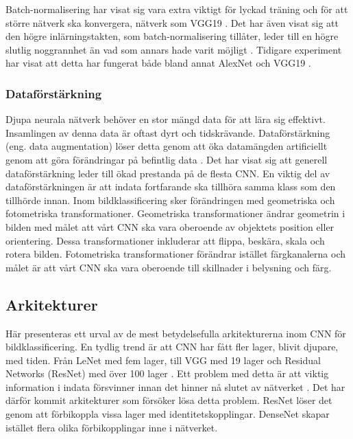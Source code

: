 \documentclass[]{kththesis}
\begin{document}
Batch-normalisering har visat sig vara extra viktigt för lyckad träning och för att större nätverk ska konvergera, nätverk som VGG19 \parencite{simon2016imagenet}. Det har även visat sig att den högre inlärningstakten, som batch-normalisering tillåter, leder till en högre slutlig noggrannhet än vad som annars hade varit möjligt \parencite{simon2016imagenet}. Tidigare experiment har visat att detta har fungerat både bland annat AlexNet och VGG19 \parencite{simon2016imagenet}.

\subsubsection{Dataförstärkning}
Djupa neurala nätverk behöver en stor mängd data för att lära sig effektivt. Insamlingen av denna data är oftast dyrt och tidskrävande. Dataförstärkning (eng. data augmentation) löser detta genom att öka datamängden artificiellt genom att göra förändringar på befintlig data \parencite{taylor2017improving}. Det har visat sig att generell dataförstärkning leder till ökad prestanda på de flesta CNN. En viktig del av dataförstärkningen är att indata fortfarande ska tillhöra samma klass som den tillhörde innan. Inom bildklassificering sker förändringen med geometriska och fotometriska transformationer. Geometriska transformationer ändrar geometrin i bilden med målet att vårt CNN ska vara oberoende av objektets position eller orientering. Dessa transformationer inkluderar att flippa, beskära, skala och rotera bilden. Fotometriska transformationer förändrar istället färg\-kanal\-er\-na och målet är att vårt CNN ska vara oberoende till skillnader i be\-lys\-ning och färg. 

\subsection{Arkitekturer}
Här presenteras ett urval av de mest betydelsefulla arkitekturerna inom CNN för bildklassificering. En tydlig trend är att CNN har fått fler lager, blivit djupare, med tiden. Från LeNet \parencite{lecun1998gradient} med fem lager, till VGG med 19 lager \parencite{simonyan2014very} och Residual Networks (ResNet) med över 100 lager \parencite{he2016deep}. Ett problem med detta är att viktig information i indata försvinner innan det hinner nå slutet av nätverket \parencite{huang2017densely}. Det har därför kommit arkitekturer som försöker lösa detta problem. ResNet löser det genom att förbikoppla vissa lager med identitetskopplingar. DenseNet skapar istället flera olika förbikopplingar inne i nätverket.
\end{document}
